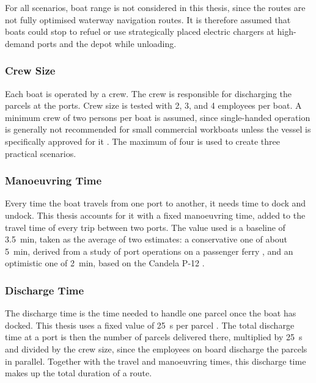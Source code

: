 \documentclass[12pt]{article}
\begin{document}
For all scenarios, boat range is not considered in this thesis, since the routes are not fully optimised waterway navigation routes. It is therefore assumed that boats could stop to refuel or use strategically placed electric chargers at high-demand ports and the depot while unloading.

\subsubsection{Crew Size}
\label{subsubsec:crew-size}

Each boat is operated by a crew. The crew is responsible for discharging the parcels at the ports. Crew size is tested with \num{2}, \num{3}, and \num{4} employees per boat. A minimum crew of two persons per boat is assumed, since single-handed operation is generally not recommended for small commercial workboats unless the vessel is specifically approved for it \parencite{mca2023workboatcode}. The maximum of four is used to create three practical scenarios.

\subsubsection{Manoeuvring Time}
\label{subsubsec:maneuvering-time}

Every time the boat travels from one port to another, it needs time to dock and undock. This thesis accounts for it with a fixed manoeuvring time, added to the travel time of every trip between two ports. The value used is a baseline of \qty{3.5}{\minute}, taken as the average of two estimates: a conservative one of about \qty{5}{\minute}, derived from a study of port operations on a passenger ferry \parencite{klovning2024efficiency}, and an optimistic one of \qty{2}{\minute}, based on the Candela P-12 \parencite{candela2026p12}.

\subsubsection{Discharge Time}
\label{subsubsec:discharge-time}

The discharge time is the time needed to handle one parcel once the boat has docked. This thesis uses a fixed value of \qty{25}{\second} per parcel \parencite{toiparcellockers}. The total discharge time at a port is then the number of parcels delivered there, multiplied by \qty{25}{\second} and divided by the crew size, since the employees on board discharge the parcels in parallel. Together with the travel and manoeuvring times, this discharge time makes up the total duration of a route.
\end{document}
